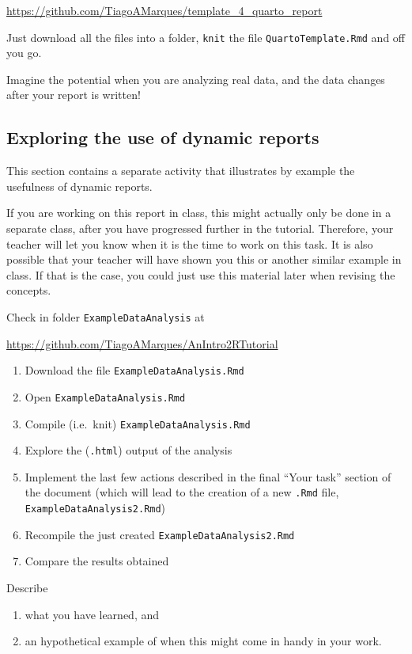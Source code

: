 \documentclass[
  letterpaper,
  DIV=11,
  numbers=noendperiod]{scrartcl}
\providecommand{\tightlist}{%
  \setlength{\itemsep}{0pt}\setlength{\parskip}{0pt}}
\begin{document}
\url{https://github.com/TiagoAMarques/template_4_quarto_report}

Just download all the files into a folder, \texttt{knit} the file
\texttt{QuartoTemplate.Rmd} and off you go.

Imagine the potential when you are analyzing real data, and the data
changes after your report is written!

\subsection{Exploring the use of dynamic
reports}\label{exploring-the-use-of-dynamic-reports}

This section contains a separate activity that illustrates by example
the usefulness of dynamic reports.

If you are working on this report in class, this might actually only be
done in a separate class, after you have progressed further in the
tutorial. Therefore, your teacher will let you know when it is the time
to work on this task. It is also possible that your teacher will have
shown you this or another similar example in class. If that is the case,
you could just use this material later when revising the concepts.

Check in folder \texttt{ExampleDataAnalysis} at

\url{https://github.com/TiagoAMarques/AnIntro2RTutorial}

\begin{enumerate}
\def\labelenumi{\arabic{enumi}.}
\tightlist
\item
  Download the file \texttt{ExampleDataAnalysis.Rmd}
\item
  Open \texttt{ExampleDataAnalysis.Rmd}
\item
  Compile (i.e.~knit) \texttt{ExampleDataAnalysis.Rmd}
\item
  Explore the (\texttt{.html}) output of the analysis
\item
  Implement the last few actions described in the final ``Your task''
  section of the document (which will lead to the creation of a new
  \texttt{.Rmd} file, \texttt{ExampleDataAnalysis2.Rmd})
\item
  Recompile the just created \texttt{ExampleDataAnalysis2.Rmd}
\item
  Compare the results obtained
\end{enumerate}

Describe

\begin{enumerate}
\def\labelenumi{\arabic{enumi}.}
\tightlist
\item
  what you have learned, and
\item
  an hypothetical example of when this might come in handy in your work.
\end{enumerate}
\end{document}
